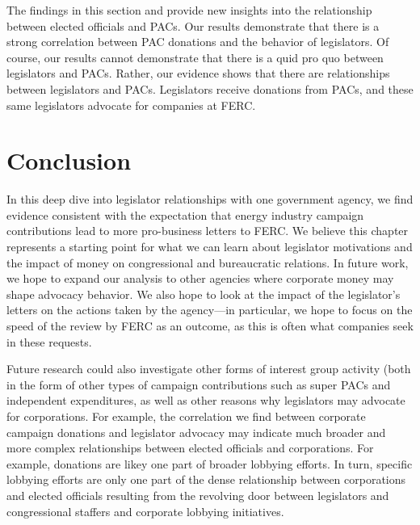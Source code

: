 \documentclass{article}
\begin{document}
The findings in this section and provide new insights into the relationship between elected officials and PACs.  Our results demonstrate that there is a strong correlation between PAC donations and the behavior of legislators.  
Of course, our results cannot demonstrate that there is a quid pro quo between legislators and PACs.  Rather, our evidence shows that there are relationships between legislators and PACs. Legislators receive donations from PACs, and these same legislators advocate for companies at FERC.       

\section{Conclusion}

In this deep dive into legislator relationships with one government agency, we find evidence consistent with the expectation that energy industry campaign contributions lead to more pro-business letters to FERC.  
We believe this chapter represents a starting point for what we can learn about legislator motivations and the impact of money on congressional and bureaucratic relations.  In future work, we hope to expand our analysis to other agencies where corporate money may shape advocacy behavior. We also hope to look at the impact of the legislator's letters on the actions taken by the agency---in particular, we hope to focus on the speed of the review by FERC as an outcome, as this is often what companies seek in these requests. 

Future research could also investigate other forms of interest group activity (both in the form of other types of campaign contributions such as super PACs and independent expenditures, as well as other reasons why legislators may advocate for corporations. For example, the correlation we find between corporate campaign donations and legislator advocacy may indicate much broader and more complex relationships between elected officials and corporations. For example, donations are likey one part of broader lobbying efforts. In turn, specific lobbying efforts are only one part of the dense relationship between corporations and elected officials resulting from the revolving door between legislators and congressional staffers and corporate lobbying initiatives.  
\end{document}
